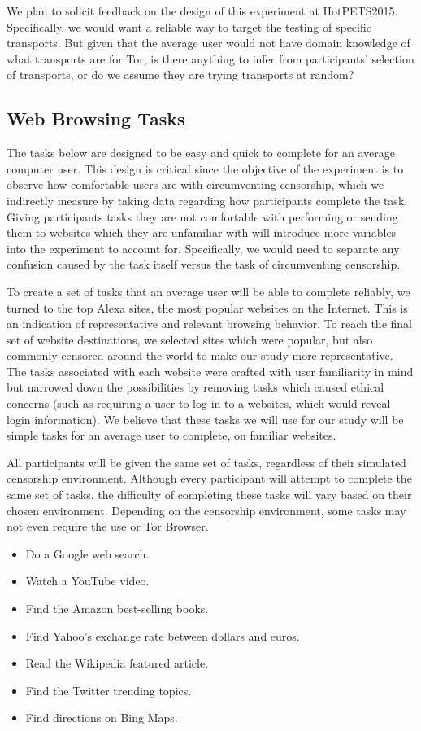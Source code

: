 \documentclass[letterpaper,twocolumn,11pt]{article}
\begin{document}
We plan to solicit feedback on the design of this experiment at HotPETS2015.
Specifically, we would want a reliable way to target the testing of 
specific transports. But given that the average user would not have domain knowledge of 
what transports are for Tor, is there anything to infer from participants' selection of transports, 
or do we assume they are trying transports at random?

\subsection{Web Browsing Tasks}
\indent \indent The tasks below are designed to be easy and quick to complete for an average
computer user. This design is critical since the objective of the experiment is to observe
how comfortable users are with circumventing censorship, which we indirectly measure
by taking data regarding how participants complete the task. Giving participants tasks 
they are not comfortable with performing or sending them to websites which they are 
unfamiliar with will introduce more variables into the experiment to account for. 
Specifically, we would need to separate any confusion caused by the task itself versus
the task of circumventing censorship. 

To create a set of tasks that an average user will be able to complete reliably, 
we turned to the top Alexa sites, the most popular websites on the Internet. This 
is an indication of representative and relevant browsing behavior. To reach the final
set of website destinations, we selected sites which were popular, but also commonly
censored around the world to make our study more representative. The tasks 
associated with each website were crafted with user familiarity in mind but narrowed 
down the possibilities by removing tasks which caused ethical concerns (such as 
requiring a user to log in to a websites, which would reveal login information).  
We believe that these tasks we will use for our study will be simple tasks for an average 
user to complete, on familiar websites. 

All participants will be given the same set of tasks, regardless of their simulated
censorship environment.  Although every participant will attempt to complete the same 
set of tasks, the difficulty of completing these tasks will vary based on their chosen environment. 
Depending on the censorship environment, some tasks may not even require the use or Tor Browser. 

\begin{itemize} \itemsep1pt \parskip0pt 
\item Do a Google web search.
\item Watch a YouTube video.
\item Find the Amazon best-selling books.
\item Find Yahoo's exchange rate between dollars and euros.
\item Read the Wikipedia featured article.
\item Find the Twitter trending topics.
\item Find directions on Bing Maps.
\end{itemize}
\end{document}
